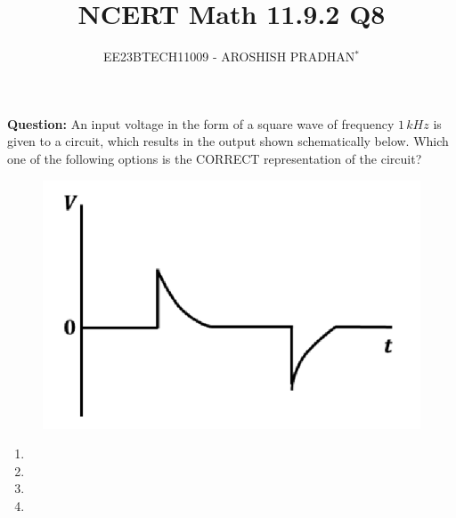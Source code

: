 \documentclass[journal,12pt,twocolumn]{IEEEtran}
\theoremstyle{remark}
\begin{document}

\vspace{3cm}

\title{NCERT Math 11.9.2 Q8}
\author{EE23BTECH11009 - AROSHISH PRADHAN$^{*}$%
}
\maketitle
\newpage
\bigskip
\textbf{Question:} An input voltage in the form of a square wave of frequency $1\, kHz$ is given to a circuit, which results in the output shown schematically below. Which one of the following options is the CORRECT representation of the circuit?

\begin{figure}[!h]
    \centering
    \includegraphics[width = \columnwidth]{figs/question.png}
    \caption{}
    \label{fig:ques_gate.ph.23.37}
\end{figure}

\begin{enumerate}[label = (\alph*)]
    \item
    \begin{minipage}[t]{\columnwidth}
        
    \end{minipage}
    \item
    \begin{minipage}[t]{\columnwidth}
        
    \end{minipage}
    \item
    \begin{minipage}[t]{\columnwidth}
        
    \end{minipage}
    \item
    \begin{minipage}[t]{\columnwidth}
        
    \end{minipage}
\end{enumerate}
\end{document}
